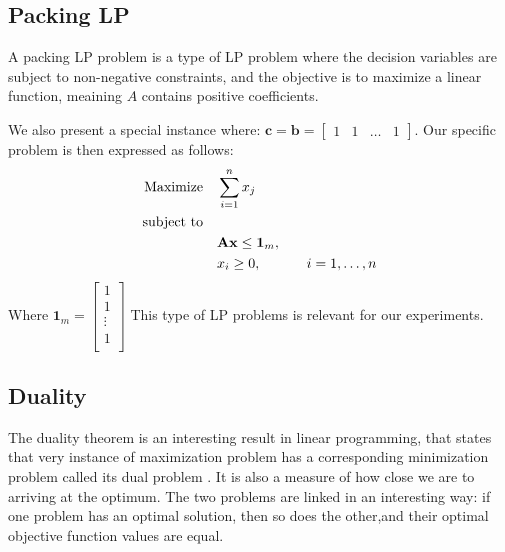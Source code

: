 \subsection{Packing LP}
A packing LP problem is a type of LP problem where the decision variables are subject to non-negative constraints, and the objective is to maximize a linear function, meaining $A$ contains positive coefficients.

We also present a special instance where:
\( \mathbf{c}  = \mathbf{b} =  \begin{bmatrix}
    1 & 1 & \dots & 1
\end{bmatrix} \).
Our specific problem is then expressed as follows:
\begin{align}
    \text{Maximize} \quad   & \sum_{i=1}^{n} x_j \notag                                                             \\
    \text{subject to} \quad & \notag                                                                                \\
                            & \mathbf{A} \mathbf{x} \leq \mathbf{1}_m, \quad                                        \\
                            & x_i \geq 0, \quad                              & i = 1, \ldots, n \label{PLP_Problem}
\end{align}
Where $\mathbf{1}_m = \begin{bmatrix}
        1      \\
        1      \\
        \vdots \\
        1      \\
    \end{bmatrix}$
This type of LP problems is relevant for our experiments.

\subsection{Duality}\label{duality}

The duality theorem is an interesting result in linear programming, that states that very instance of maximization problem has a corresponding minimization problem called its dual problem \parencite{chvatal1983linear}. It is also a measure of how close we are to arriving at the optimum. The two problems are linked in an interesting way: if one problem has an optimal solution, then so does the other,and their optimal objective function values are equal.

